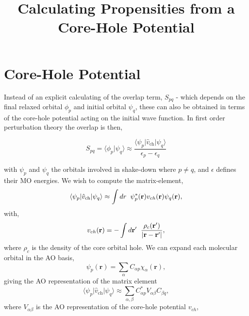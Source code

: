 \documentclass[11pt]{article}
\title{Calculating Propensities from a Core-Hole Potential}
\begin{document}
\section{Core-Hole Potential}

Instead of an explicit calculating of the overlap term, $S_{pq}$ - which depends on the final relaxed orbital $\phi_p$ and initial orbital $\psi_q$, these can also be obtained in terms of the core-hole potential acting on the initial wave function. In first order perturbation theory the overlap is then,

\begin{equation}
  S_{pq} = \langle\phi_p|\psi_q \rangle \approx
      \frac{\langle\psi_p|\hat{v}_{\mathrm{ch}}|\psi_q\rangle}{\epsilon_p - \epsilon_q}
\label{eq:final_propensity_rule}
\end{equation}

with $\psi_p$ and $\psi_q$ the orbitals involved in shake-down where $p \neq q$, and $\epsilon$ defines their MO energies. We wish to compute the matrix-element,
\begin{equation}
    \langle \psi_p|\hat{v}_{\mathrm{ch}}|\psi_q \rangle \approx \int  dr \hspace{2mm} \psi_p^*(\mathbf{r}) v_{ch}(\mathbf{r})\psi_q(\mathbf{r}),
\end{equation}
with,
\begin{equation}
    v_{ch}(\mathbf{r}) = - \int d\mathbf{r}^{\prime} \hspace{2mm} \frac{\rho_c (\mathbf{r}^{\prime})}{|\mathbf{r}-\mathbf{r}^{\prime}|},
\end{equation}    
where $\rho_c$ is the density of the core orbital hole. We can expand each molecular orbital in the AO basis,
\begin{equation}
  \psi_p(\mathbf{r}) = \sum_{\alpha} C_{\alpha p} \chi_\alpha(\mathbf{r}),
\end{equation}
giving the AO representation of the matrix element
\begin{equation}
  \langle \psi_p|\hat{v}_{\mathrm{ch}}|\psi_q\rangle
  \approx
  \sum_{\alpha,\beta}
  C_{\alpha p}^{*}
  V_{\alpha\beta}
  C_{\beta q},
  \label{eq:local_core_hole_ao}
\end{equation}
where $V_{\alpha\beta}$ is the AO representation of the core-hole potential $v_{ch}$,
\end{document}
